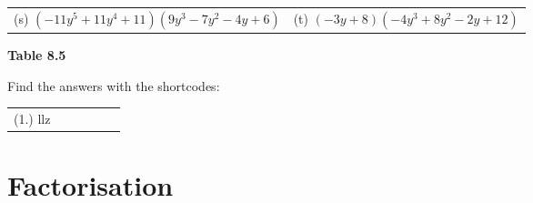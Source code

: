 \begin{enumerate}[noitemsep, label=\textbf{\arabic*}. ]
{\begin{center}
\begin{xtabular*}{\mytablewidth}[t]{|p{10\mystarwidth}|p{10\mystarwidth}|}
        (s) $\left(-11{y}^{5}+11{y}^{4}+11\right)\left(9{y}^{3}-7{y}^{2}-4y+6\right)$ &
        (t) $\left(-3y+8\right)\left(-4{y}^{3}+8{y}^{2}-2y+12\right)$%
     \tabularnewline{}
    \end{xtabular*}
      \end{center}
    \begin{center}{\small\bfseries Table 8.5}\end{center}
        }%
    \par
  \newline
\newline
        \end{enumerate}
  \label{m39387**end}
\par {} Find the answers with the shortcodes:
 \par \begin{tabular}[h]{cccccc}
 (1.) llz  & \end{tabular}
         \section{ Factorisation}
